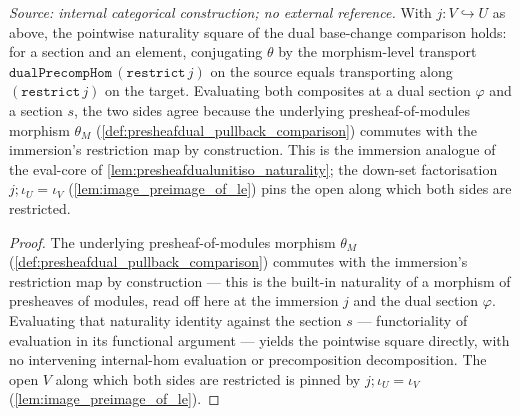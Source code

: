 \begin{lemma}

  \label{lem:presheafdual_pullback_restrict_natural_apply}
  \textit{Source: internal categorical construction; no external reference.}
  With \(j : V \hookrightarrow U\) as above, the pointwise naturality square of the dual base-change
  comparison holds: for a section and an element, conjugating \(\theta\) by the morphism-level
  transport \(\mathtt{dualPrecompHom}\,(\mathtt{restrict}\,j)\) on the source equals transporting along
  \((\mathtt{restrict}\,j)\) on the target. Evaluating both composites at a dual section \(\varphi\)
  and a section \(s\), the two sides agree because the underlying presheaf-of-modules morphism
  \(\theta_M\) (\cref{def:presheafdual_pullback_comparison}) commutes with the immersion's restriction
  map by construction. This is the immersion analogue of the eval-core of
  \cref{lem:presheafdualunitiso_naturality}; the down-set factorisation
  \(j \mathbin{;} \iota_U = \iota_V\) (\cref{lem:image_preimage_of_le}) pins the open along which both
  sides are restricted.
\end{lemma}
\begin{proof}
  \leanok
  The underlying presheaf-of-modules morphism \(\theta_M\)
  (\cref{def:presheafdual_pullback_comparison}) commutes with the immersion's restriction map by
  construction --- this is the built-in naturality of a morphism of presheaves of modules, read off
  here at the immersion \(j\) and the dual section \(\varphi\). Evaluating that naturality identity
  against the section \(s\) --- functoriality of evaluation in its functional argument --- yields the
  pointwise square directly, with no intervening internal-hom evaluation or precomposition
  decomposition. The open \(V\) along which both sides are restricted is pinned by
  \(j \mathbin{;} \iota_U = \iota_V\) (\cref{lem:image_preimage_of_le}).
\end{proof}

